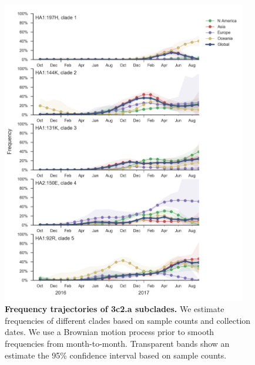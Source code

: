 \documentclass[11pt,oneside,letterpaper]{article}
\begin{document}
\begin{figure}[h!]
  \centering
  \includegraphics[width=0.95\textwidth]{../figures/sep-2017/h3n2_mutations.png}
  \caption{\textbf{Frequency trajectories of 3c2.a subclades.}
  We estimate frequencies of different clades based on sample counts and collection dates.
  We use a Brownian motion process prior to smooth frequencies from month-to-month.
  Transparent bands show an estimate the 95\% confidence interval based on sample counts.
  }
  \label{H3N2_mutations}
\end{figure}
\end{document}

